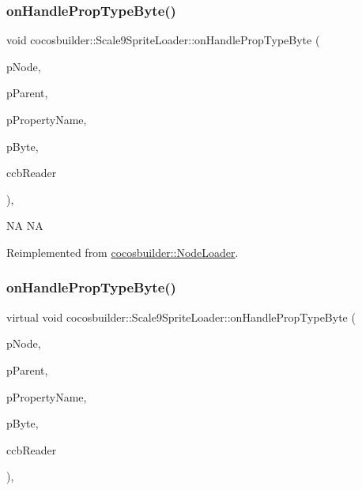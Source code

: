 \subsubsection{\texorpdfstring{on\+Handle\+Prop\+Type\+Byte()}{onHandlePropTypeByte()}\hspace{0.1cm}{\footnotesize\ttfamily [1/2]}}
{\footnotesize\ttfamily void cocosbuilder\+::\+Scale9\+Sprite\+Loader\+::on\+Handle\+Prop\+Type\+Byte (\begin{DoxyParamCaption}\item[{cocos2d\+::\+Node $\ast$}]{p\+Node,  }\item[{cocos2d\+::\+Node $\ast$}]{p\+Parent,  }\item[{const char $\ast$}]{p\+Property\+Name,  }\item[{unsigned char}]{p\+Byte,  }\item[{\hyperlink{classcocosbuilder_1_1CCBReader}{C\+C\+B\+Reader} $\ast$}]{ccb\+Reader }\end{DoxyParamCaption})\hspace{0.3cm}{\ttfamily [protected]}, {\ttfamily [virtual]}}

NA  NA 

Reimplemented from \hyperlink{classcocosbuilder_1_1NodeLoader}{cocosbuilder\+::\+Node\+Loader}.

\mbox{\label{classcocosbuilder_1_1Scale9SpriteLoader_ac2f65e69901bcdacacd4c893716ccc8a}} 
\subsubsection{\texorpdfstring{on\+Handle\+Prop\+Type\+Byte()}{onHandlePropTypeByte()}\hspace{0.1cm}{\footnotesize\ttfamily [2/2]}}
{\footnotesize\ttfamily virtual void cocosbuilder\+::\+Scale9\+Sprite\+Loader\+::on\+Handle\+Prop\+Type\+Byte (\begin{DoxyParamCaption}\item[{cocos2d\+::\+Node $\ast$}]{p\+Node,  }\item[{cocos2d\+::\+Node $\ast$}]{p\+Parent,  }\item[{const char $\ast$}]{p\+Property\+Name,  }\item[{unsigned char}]{p\+Byte,  }\item[{\hyperlink{classcocosbuilder_1_1CCBReader}{C\+C\+B\+Reader} $\ast$}]{ccb\+Reader }\end{DoxyParamCaption})\hspace{0.3cm}{\ttfamily [protected]}, {\ttfamily [virtual]}}

